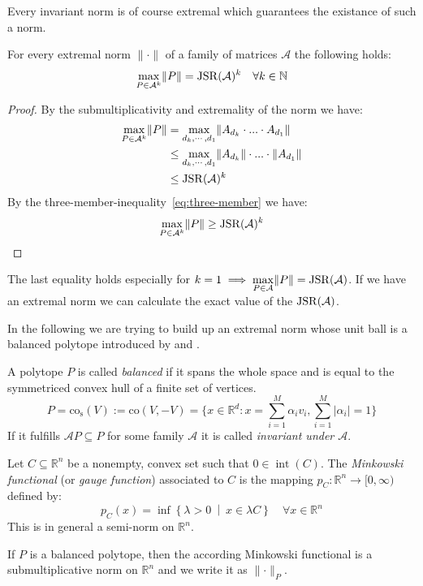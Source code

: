 Every invariant norm is of course extremal which guarantees the existance of such a norm. 
  
\begin{theorem}
    For every extremal norm $\lVert \cdot \rVert$ of a family of matrices $\mathcal{A}$ the following holds:
    $$
    \max \limits_{P \in \mathcal{A}^k} \lVert P \rVert = \operatorname{JSR}(\mathcal{A})^k \quad \forall k \in \mathbb{N}
    $$
\end{theorem}
\begin{proof}
    By the submultiplicativity and extremality of the norm we have:
    $$
    \begin{aligned}
        \max \limits_{P \in \mathcal{A}^k} \lVert P \rVert & = \max \limits_{d_k,\cdots,d_1} \lVert A_{d_k}\cdot...\cdot A_{d_1} \rVert \\
        & \le \max \limits_{d_k,\cdots,d_1} \lVert A_{d_k} \rVert \cdot...\cdot \lVert A_{d_1} \rVert \\
        & \le \operatorname{JSR}(\mathcal{A})^k 
    \end{aligned}
    $$
    By the three-member-inequality~\ref{eq:three-member} we have:
    $$
    \max \limits_{P \in \mathcal{A}^k} \lVert P \rVert \ge \operatorname{JSR}(\mathcal{A})^k 
    $$

\end{proof}

\begin{remark}
    The last equality holds especially for $k = 1 \implies \max \limits_{P \in \mathcal{A}} \lVert P \rVert = \operatorname{JSR}(\mathcal{A})$.
    If we have an extremal norm we can calculate the exact value of the $\operatorname{JSR}(\mathcal{A})$. 
\end{remark}

In the following we are trying to build up an extremal norm whose unit ball is a balanced polytope introduced by \citep{protasov1996joint} and \citep{guglielmi2008algorithm}.

\begin{definition}
    A polytope $P$ is called \emph{balanced} if it spans the whole space and is equal to the symmetriced convex hull of a finite set of vertices.
    $$P = \text{co}_{\text{s}}(V) := \text{co}(V, -V) = \{x \in \mathbb{R}^d : x = \sum_{i=1}^M \alpha_i v_i, \sum_{i=1}^M |\alpha_i| = 1\}$$
    If it fulfills $\mathcal{A}P \subseteq P$ for some family $\mathcal{A}$ it is called \emph{invariant under $\mathcal{A}$}.
\end{definition}


\begin{definition}
    Let $C \subseteq \mathbb{R}^n$ be a nonempty, convex set such that $0 \in \operatorname{int}(C)$.
    The \emph{Minkowski functional} (or \emph{gauge function}) associated to $C$ is the mapping $p_C : \mathbb{R}^n \to [0,\infty)$ defined by:
    \[
    p_C(x) = \inf\left\{ \lambda > 0 \ \middle| \ x \in \lambda C \right\} \quad \forall x \in \mathbb{R}^n
    \]
    This is in general a semi-norm on $\mathbb{R}^n$.

\end{definition}
\begin{remark}
    If $P$ is a balanced polytope, then the according Minkowski functional is a submultiplicative norm on $\mathbb{R}^n$ and we write it as $\lVert \cdot \rVert _P$.
\end{remark}

